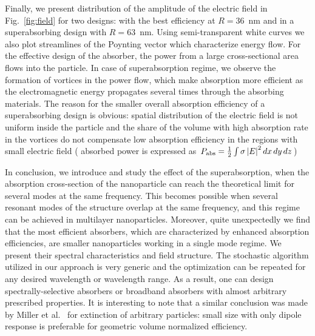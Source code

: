 \documentclass[aps,prl,twocolumn,showpacs,superscriptaddress,groupedaddress]{revtex4-1}
\begin{document}
\begin{figure}
\end{figure}
Finally, we present distribution of the amplitude of the electric
field in Fig.~\ref{fig:field} for two designs: with the best
efficiency at $R=36$~nm and in a superabsorbing design with
$R=63$~nm.  Using semi-transparent white curves we also plot
streamlines of the Poynting vector which characterize energy flow.
For the effective design of the absorber, the power from a large
cross-sectional area flows into the particle.  In case of
superabsorption regime, we observe the formation of vortices in the
power flow, which make absorption more efficient as the
electromagnetic energy propagates several times through the absorbing
materials.  The reason for the smaller overall absorption efficiency
of a superabsorbing design is obvious: spatial distribution of the
electric field is not uniform inside the particle and the share of the
volume with high absorption rate in the vortices do not compensate low
absorption efficiency in the regions with small electric field (
absorbed power is expressed as $P_{\rm abs}=\frac{1}{2}\int\sigma
\left|E\right|^2dx\,dy\,dz$)

In conclusion, we introduce and study the effect of the
superabsorption, when the absorption cross-section of the
nanoparticle can reach the theoretical limit for several modes at the
same frequency. This becomes possible when several resonant modes of
the structure overlap at the same frequency, and this regime can be
achieved in multilayer nanoparticles. Moreover, quite unexpectedly we
find that the most efficient absorbers, which are characterized by
enhanced absorption efficiencies, are smaller nanoparticles working in
a single mode regime. We present their spectral characteristics and
field structure.  The stochastic algorithm utilized in our approach is
very generic and the optimization can be repeated for any desired
wavelength or wavelength range.  As a result, one can design
spectrally-selective absorbers or broadband absorbers with almost
arbitrary prescribed properties.  It is interesting to note that a
similar conclusion was made by Miller et al.~\cite{Miller-2014} for
extinction of arbitrary particles: small size with only dipole
response is preferable for geometric volume normalized efficiency.
\end{document}
